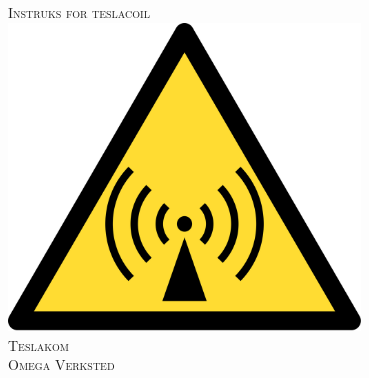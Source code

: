 \begin{titlepage}
\thispagestyle{empty}
\centering
\textsc{\Huge Instruks for teslacoil} \\[3cm]

\includegraphics[width=0.7\textwidth]{img/NonIonisingRadiationWarning} \\[3cm]

\textsc{\Huge Teslakom} \\
\textsc{\Huge Omega Verksted} 

\end{titlepage}